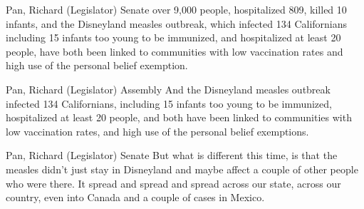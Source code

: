 \begin{result}{9.254614233689319}{Pan, Richard (Legislator) Senate}
over 9,000 people, hospitalized 809, killed 10 infants, and the Disneyland measles outbreak, which infected 134 Californians including 15 infants too young to be immunized, and hospitalized at least 20 people, have both been linked to communities with low vaccination rates and high use of the personal belief exemption.
\end{result}

\begin{result}{9.160509493034045}{Pan, Richard (Legislator) Assembly}
And the Disneyland measles outbreak infected 134 Californians, including 15 infants too young to be immunized, hospitalized at least 20 people, and both have been linked to communities with low vaccination rates, and high use of the personal belief exemptions.
\end{result}

\begin{result}{9.14432800842489}{Pan, Richard (Legislator) Senate}
But what is different this time, is that the measles didn't just stay in Disneyland and maybe affect a couple of other people who were there. It spread and spread and spread across our state, across our country, even into Canada and a couple of cases in Mexico.
\end{result}

